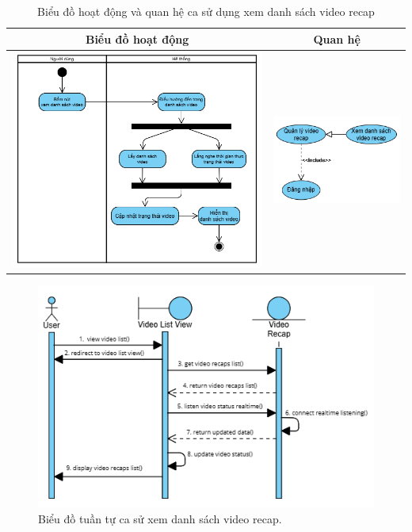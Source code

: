 \vspace{0.8cm}

\noindent 
\begin{table}[H]
\centering
\caption{Biểu đồ hoạt động và quan hệ ca sử dụng xem danh sách video recap}
\label{tab:view-video-recap-usecase-activity}
\begin{tabular}{| c | c |}
    \hline
    \textbf{Biểu đồ hoạt động} & \textbf{Quan hệ} \\ 
    \hline
    \includegraphics[width=0.6\linewidth]{figures/c3/3-3-8-activity-diagram.png} 
    &  
    \includegraphics[width=0.35\linewidth]{figures/c3/3-3-8-relationship.png} \\ 
    \hline
\end{tabular}
\end{table}

\begin{figure}[ht]
    \centering  
    \includegraphics[width=1.1\textwidth]{figures/c3/3-3-8-sequence-diagram.png}
    \caption{Biểu đồ tuần tự ca sử xem danh sách video recap.}
    \label{fig:3-3-8-sequence-diagram}
\end{figure}